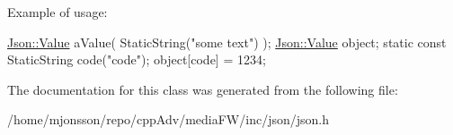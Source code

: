 Example of usage\+: 
\begin{DoxyCode}
\hyperlink{classJson_1_1Value}{Json::Value} aValue( StaticString(\textcolor{stringliteral}{"some text"}) );
\hyperlink{classJson_1_1Value}{Json::Value} object;
\textcolor{keyword}{static} \textcolor{keyword}{const} StaticString code(\textcolor{stringliteral}{"code"});
\textcolor{keywordtype}{object}[code] = 1234;
\end{DoxyCode}
 

The documentation for this class was generated from the following file\+:\begin{DoxyCompactItemize}
\item 
/home/mjonsson/repo/cpp\+Adv/media\+F\+W/inc/json/json.\+h\end{DoxyCompactItemize}
